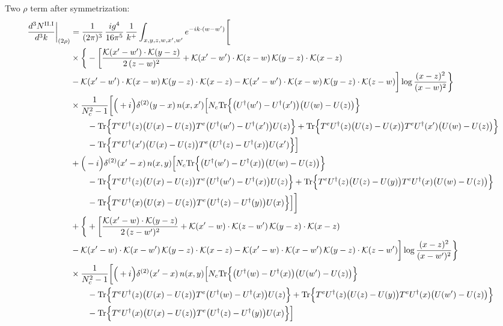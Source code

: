 \documentclass[9pt]{article}
\numberwithin{equation}{section}
\begin{document}
Two $\rho$ term after symmetrization:
\begin{align}
\frac{d^{3}N^{\rm II.I}}{d^{3}k}\bigg|_{(2\rho)} &=\frac{1}{(2\pi)^{3}}\,\frac{ig^{4}}{16\pi^{5}}\,\frac{1}{k^{+}}\int_{x,y,z,w,x',w'}e^{-ik\cdot(w-w')}\Bigg[\notag\\
&\times\bigg\{-\bigg[\frac{\mathcal{K}(x'-w')\cdot\mathcal{K}(y-z)}{2\,(z-w)^{2}}+\mathcal{K}(x'-w')\cdot\mathcal{K}(z-w)\,\mathcal{K}(y-z)\cdot\mathcal{K}(x-z)\notag\\
&-\mathcal{K}(x'-w')\cdot\mathcal{K}(x-w)\,\mathcal{K}(y-z)\cdot\mathcal{K}(x-z)-\mathcal{K}(x'-w')\cdot\mathcal{K}(x-w)\,\mathcal{K}(y-z)\cdot\mathcal{K}(z-w)\bigg]\log\frac{(x-z)^{2}}{(x-w)^{2}}\bigg\}\notag\\
&\times \frac{1}{N_{c}^{2}-1}\bigg[\Big(+i\Big)\delta^{(2)}(y-x)\,n(x,x')\Big[N_{c}{\rm Tr}\Big\{\big(U^{\dagger}(w')-U^{\dagger}(x')\big)\big(U(w)-U(z)\big)\Big\}\notag\\&\qquad-{\rm Tr}\Big\{T^{e}U^{\dagger}(z)\big(U(x)-U(z)\big)T^{e}\big(U^{\dagger}(w')-U^{\dagger}(x')\big)U(z)\Big\}+{\rm Tr}\Big\{T^{e}U^{\dagger}(z)\big(U(z)-U(x)\big)T^{e}U^{\dagger}(x')\big(U(w)-U(z)\big)\Big\}\notag\\&\qquad-{\rm Tr}\Big\{T^{e}U^{\dagger}(x')\big(U(x)-U(z)\big)T^{e}\big(U^{\dagger}(z)-U^{\dagger}(x)\big)U(x')\Big\}\Big]\notag\\
& +\Big(-i\Big)\delta^{(2)}(x'-x)\,n(x,y)\Big[N_{c}{\rm Tr}\Big\{\big(U^{\dagger}(w')-U^{\dagger}(x)\big)\big(U(w)-U(z)\big)\Big\}\notag\\&\qquad-{\rm Tr}\Big\{T^{e}U^{\dagger}(z)\big(U(x)-U(z)\big)T^{e}\big(U^{\dagger}(w')-U^{\dagger}(x)\big)U(z)\Big\}+{\rm Tr}\Big\{T^{e}U^{\dagger}(z)\big(U(z)-U(y)\big)T^{e}U^{\dagger}(x)\big(U(w)-U(z)\big)\Big\}\notag\\&\qquad-{\rm Tr}\Big\{T^{e}U^{\dagger}(x)\big(U(x)-U(z)\big)T^{e}\big(U^{\dagger}(z)-U^{\dagger}(y)\big)U(x)\Big\}\Big]\bigg]\notag\\
&+\bigg\{+\bigg[\frac{\mathcal{K}(x'-w)\cdot\mathcal{K}(y-z)}{2\,(z-w')^{2}}+\mathcal{K}(x'-w)\cdot\mathcal{K}(z-w')\,\mathcal{K}(y-z)\cdot\mathcal{K}(x-z)\notag\\
&-\mathcal{K}(x'-w)\cdot\mathcal{K}(x-w')\,\mathcal{K}(y-z)\cdot\mathcal{K}(x-z)-\mathcal{K}(x'-w)\cdot\mathcal{K}(x-w')\,\mathcal{K}(y-z)\cdot\mathcal{K}(z-w')\bigg]\log\frac{(x-z)^{2}}{(x-w')^{2}}\bigg\}\notag\\
&\times \frac{1}{N_{c}^{2}-1}\bigg[\Big(+i\Big)\delta^{(2)}(x'-x)\,n(x,y)\Big[N_{c}{\rm Tr}\Big\{\big(U^{\dagger}(w)-U^{\dagger}(x)\big)\big(U(w')-U(z)\big)\Big\}\notag\\&\qquad-{\rm Tr}\Big\{T^{e}U^{\dagger}(z)\big(U(x)-U(z)\big)T^{e}\big(U^{\dagger}(w)-U^{\dagger}(x)\big)U(z)\Big\}+{\rm Tr}\Big\{T^{e}U^{\dagger}(z)\big(U(z)-U(y)\big)T^{e}U^{\dagger}(x)\big(U(w')-U(z)\big)\Big\}\notag\\&\qquad-{\rm Tr}\Big\{T^{e}U^{\dagger}(x)\big(U(x)-U(z)\big)T^{e}\big(U^{\dagger}(z)-U^{\dagger}(y)\big)U(x)\Big\}\Big]\notag\\

\end{align}
\end{document}
